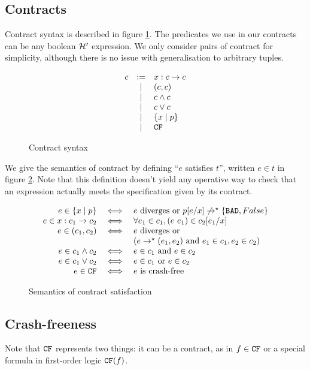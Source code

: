 \documentclass[preprint]{sigplanconf}
\begin{document}
\subsection{Contracts}
Contract syntax is described in figure \ref{cont-stx}. The predicates
we use in our contracts can be any boolean $\mathcal{H}'$ expression. We
only consider pairs of contract for simplicity, although there is no
issue with generalisation to arbitrary tuples.

\begin{figure}[h]
 \centering 
  \[  \begin{array}{rclr}
  c &:=& x:c \to c\\
  &\mid& (c,c) \\
  &\mid& c \land c \\
  &\mid& c \lor c \\
  &\mid& \{ x \mid p \}\\
  &\mid& \texttt{CF} \\
  \end{array} \]
  \caption{Contract syntax}
  \label{cont-stx}
\end{figure}

We give the semantics of contract by defining ``$e$ satisfies $t$'',
written $e \in t$ in figure \ref{cont-smt}. Note that this definition
doesn't yield any operative way to check that an expression actually
meets the specification given by its contract.

\begin{figure}[h]
 \centering
  \[  \begin{array}{rcl}
    e \in \{x \mid p \} &\iff& e \mbox{ diverges or } p[e/x] \not \to^\star \{\texttt{BAD},False\}\\
    e \in x:c_1 \to c_2 &\iff& \forall e_1 \in c_1, (e~e_1) \in c_2[e_1/x]\\
    e \in (c_1,c_2) &\iff& e \mbox{ diverges or }\\
    &&  (e \to^\star (e_1,e_2) \mbox{ and } e_1 \in c_1, e_2 \in c_2)\\
    e \in c_1 \land c_2 &\iff& e \in c_1 \mbox{ and } e \in c_2 \\
    e \in c_1 \lor c_2 &\iff& e \in c_1 \mbox{ or } e \in c_2 \\
    e \in \texttt{CF} &\iff& e \mbox{ is crash-free}
  \end{array} \]
  \caption{Semantics of contract satisfaction}
  \label{cont-smt}
\end{figure}

\subsection{Crash-freeness}
Note that $\texttt{CF}$ represents two things: it can be a contract, as in $f
\in \texttt{CF}$ or a special formula in first-order logic $\texttt{CF}(f)$.
\end{document}
